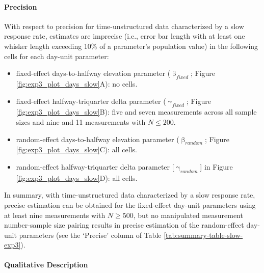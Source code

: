 \documentclass[
12pt, %
twoside,
english]{guelphthesis}
\theoremstyle{definition}
\theoremstyle{definition}
\theoremstyle{definition}
\theoremstyle{definition}
\theoremstyle{remark}
\begin{document}
\hypertarget{precision-slow-exp3}{%
\paragraph{Precision}\label{precision-slow-exp3}}

With respect to precision for time-unstructured data characterized by a slow response rate, estimates are imprecise (i.e., error bar length with at least one whisker length exceeding 10\% of a parameter's population value) in the following cells for each day-unit parameter:
\begin{itemize}
\tightlist
\item
  fixed-effect days-to-halfway elevation parameter (\(\upbeta_{fixed}\); Figure \ref{fig:exp3_plot_days_slow}A): no cells.
\item
  fixed-effect halfway-triquarter delta parameter (\(\upgamma_{fixed}\); Figure \ref{fig:exp3_plot_days_slow}B): five and seven measurements across all sample sizes and nine and 11 measurements with \(N \le 200\).
\item
  random-effect days-to-halfway elevation parameter (\(\upbeta_{random}\); Figure \ref{fig:exp3_plot_days_slow}C): all cells.
\item
  random-effect halfway-triquarter delta parameter {[}\(\upgamma_{random}\){]} in Figure \ref{fig:exp3_plot_days_slow}D): all cells.
\end{itemize}
In summary, with time-unstructured data characterized by a slow response rate, precise estimation can be obtained for the fixed-effect day-unit parameters using at least nine measurements with \(N \ge 500\), but no manipulated measurement number-sample size pairing results in precise estimation of the random-effect day-unit parameters (see the `Precise' column of Table \ref{tab:summary-table-slow-exp3}).

\hypertarget{qualitative-slow-exp3}{%
\paragraph{Qualitative Description}\label{qualitative-slow-exp3}}
\end{document}
